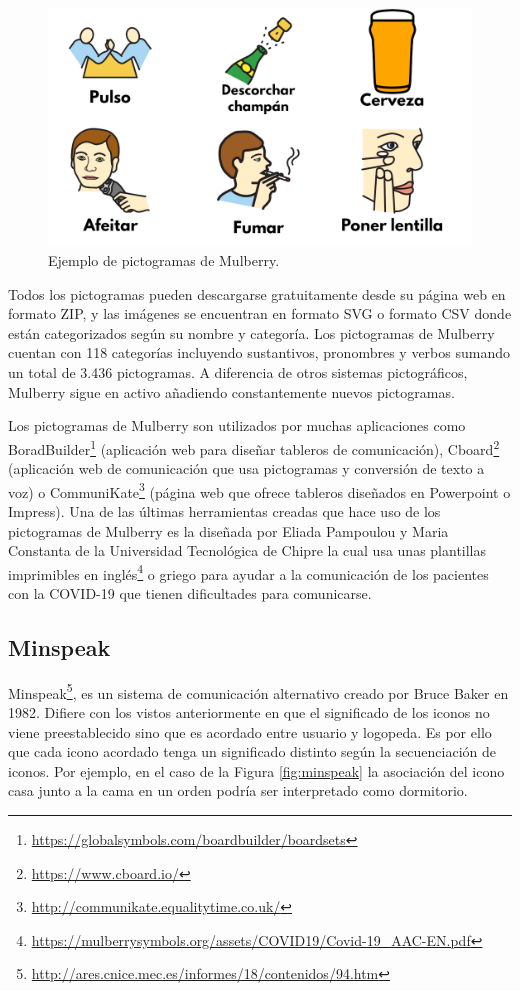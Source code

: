 \begin{figure}[h!]
	\centering
	\includegraphics[scale=0.2]{Imagenes/Bitmap/Mulberry}
	\caption{Ejemplo de pictogramas de Mulberry.}
	\label{fig:mulberry}
\end{figure}

Todos los pictogramas pueden descargarse gratuitamente desde su página web en formato ZIP, y las imágenes se encuentran en formato SVG o formato CSV donde están categorizados según su nombre y categoría. 
Los pictogramas de Mulberry cuentan con 118 categorías incluyendo sustantivos, pronombres y verbos sumando un total de 3.436 pictogramas. A diferencia de otros sistemas pictográficos, Mulberry sigue en activo añadiendo constantemente nuevos pictogramas. 

Los pictogramas de Mulberry son utilizados por muchas aplicaciones como BoradBuilder\footnote{\url{ https://globalsymbols.com/boardbuilder/boardsets}} (aplicación web para diseñar tableros de comunicación), Cboard\footnote{\url{https://www.cboard.io/}} (aplicación web de comunicación que usa pictogramas y conversión de texto a voz) o CommuniKate\footnote{\url{http://communikate.equalitytime.co.uk/}} (página web que ofrece tableros diseñados en Powerpoint o Impress). Una de las últimas herramientas creadas que hace uso de los pictogramas de Mulberry es la diseñada por Eliada Pampoulou y Maria Constanta de la Universidad Tecnológica de Chipre la cual usa unas plantillas imprimibles en inglés\footnote{\url{https://mulberrysymbols.org/assets/COVID19/Covid-19_AAC-EN.pdf}} o griego para ayudar a la comunicación de los pacientes con la COVID-19 que tienen dificultades para comunicarse.






\subsection{Minspeak}
\label{cap3:sec:minspeak}
Minspeak\footnote{\url{http://ares.cnice.mec.es/informes/18/contenidos/94.htm}}, es un sistema de comunicación alternativo creado por Bruce Baker en 1982. Difiere con los vistos anteriormente en que el significado de los iconos no viene preestablecido sino que es acordado entre usuario y logopeda. Es por ello que cada icono acordado tenga un significado distinto según la secuenciación de iconos. Por ejemplo, en el caso de la Figura \ref{fig:minspeak} la asociación del icono casa junto a la cama en un orden podría ser interpretado como dormitorio. 

